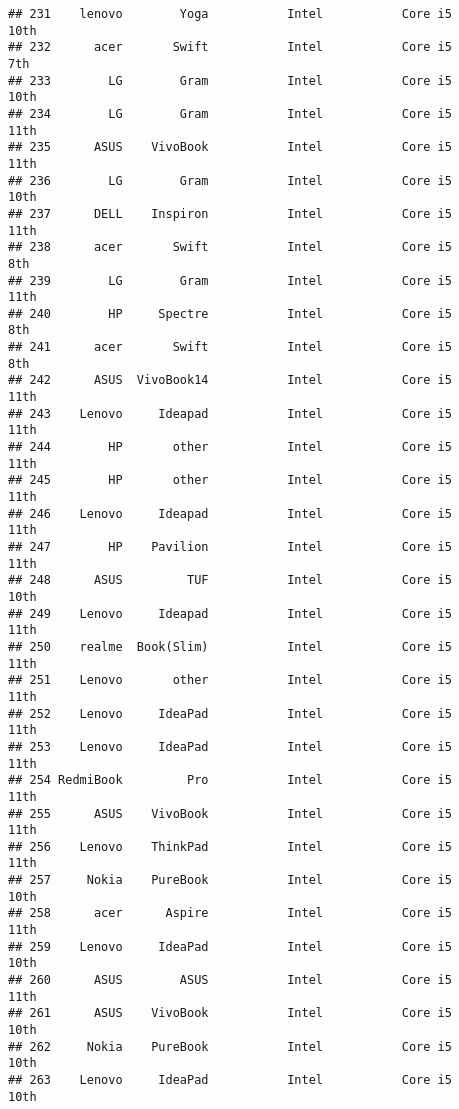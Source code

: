 \documentclass[
]{article}
\begin{document}
\begin{verbatim}
## 231    lenovo        Yoga           Intel           Core i5            10th
## 232      acer       Swift           Intel           Core i5             7th
## 233        LG        Gram           Intel           Core i5            10th
## 234        LG        Gram           Intel           Core i5            11th
## 235      ASUS    VivoBook           Intel           Core i5            11th
## 236        LG        Gram           Intel           Core i5            10th
## 237      DELL    Inspiron           Intel           Core i5            11th
## 238      acer       Swift           Intel           Core i5             8th
## 239        LG        Gram           Intel           Core i5            11th
## 240        HP     Spectre           Intel           Core i5             8th
## 241      acer       Swift           Intel           Core i5             8th
## 242      ASUS  VivoBook14           Intel           Core i5            11th
## 243    Lenovo     Ideapad           Intel           Core i5            11th
## 244        HP       other           Intel           Core i5            11th
## 245        HP       other           Intel           Core i5            11th
## 246    Lenovo     Ideapad           Intel           Core i5            11th
## 247        HP    Pavilion           Intel           Core i5            11th
## 248      ASUS         TUF           Intel           Core i5            10th
## 249    Lenovo     Ideapad           Intel           Core i5            11th
## 250    realme  Book(Slim)           Intel           Core i5            11th
## 251    Lenovo       other           Intel           Core i5            11th
## 252    Lenovo     IdeaPad           Intel           Core i5            11th
## 253    Lenovo     IdeaPad           Intel           Core i5            11th
## 254 RedmiBook         Pro           Intel           Core i5            11th
## 255      ASUS    VivoBook           Intel           Core i5            11th
## 256    Lenovo    ThinkPad           Intel           Core i5            11th
## 257     Nokia    PureBook           Intel           Core i5            10th
## 258      acer      Aspire           Intel           Core i5            11th
## 259    Lenovo     IdeaPad           Intel           Core i5            10th
## 260      ASUS        ASUS           Intel           Core i5            11th
## 261      ASUS    VivoBook           Intel           Core i5            10th
## 262     Nokia    PureBook           Intel           Core i5            10th
## 263    Lenovo     IdeaPad           Intel           Core i5            10th

\end{verbatim}
\end{document}
